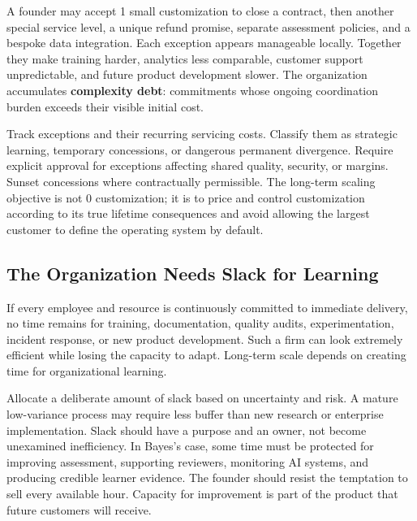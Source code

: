 A founder may accept 1 small customization to close a contract, then another special service level, a unique refund promise, separate assessment policies, and a bespoke data integration. Each exception appears manageable locally. Together they make training harder, analytics less comparable, customer support unpredictable, and future product development slower. The organization accumulates \textbf{complexity debt}: commitments whose ongoing coordination burden exceeds their visible initial cost.

Track exceptions and their recurring servicing costs. Classify them as strategic learning, temporary concessions, or dangerous permanent divergence. Require explicit approval for exceptions affecting shared quality, security, or margins. Sunset concessions where contractually permissible. The long-term scaling objective is not 0 customization; it is to price and control customization according to its true lifetime consequences and avoid allowing the largest customer to define the operating system by default.

\subsection{The Organization Needs Slack for Learning}
\label{sec:organization_slack_for_learning}

If every employee and resource is continuously committed to immediate delivery, no time remains for training, documentation, quality audits, experimentation, incident response, or new product development. Such a firm can look extremely efficient while losing the capacity to adapt. Long-term scale depends on creating time for organizational learning.

Allocate a deliberate amount of slack based on uncertainty and risk. A mature low-variance process may require less buffer than new research or enterprise implementation. Slack should have a purpose and an owner, not become unexamined inefficiency. In Bayes's case, some time must be protected for improving assessment, supporting reviewers, monitoring AI systems, and producing credible learner evidence. The founder should resist the temptation to sell every available hour. Capacity for improvement is part of the product that future customers will receive.
